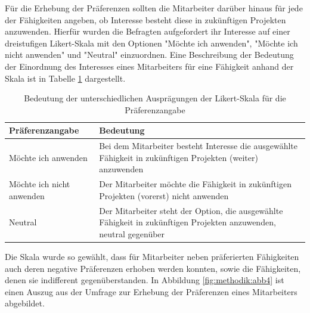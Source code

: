 Für die Erhebung der Präferenzen sollten die Mitarbeiter darüber hinaus für jede der Fähigkeiten angeben, ob Interesse besteht diese in zukünftigen Projekten anzuwenden.
Hierfür wurden die Befragten aufgefordert ihr Interesse auf einer dreistufigen Likert-Skala mit den Optionen "Möchte ich anwenden", "Möchte ich nicht anwenden" und "Neutral" einzuordnen.
Eine Beschreibung der Bedeutung der Einordnung des Interesses eines Mitarbeiters für eine Fähigkeit anhand der Skala ist in Tabelle \ref{tab:methodik:tab2} dargestellt.

\begin{table}[htbp]
    \begin{center}
    \begin{tabular}{p{1.5in}|p{3.25in}}
    {\textbf{Präferenzangabe}} & {\textbf{Bedeutung}}\\
    \hline
	Möchte ich anwenden & Bei dem Mitarbeiter besteht Interesse die ausgewählte Fähigkeit in zukünftigen Projekten (weiter) anzuwenden \\
    \hline
    Möchte ich nicht anwenden & Der Mitarbeiter möchte die Fähigkeit in zukünftigen Projekten (vorerst) nicht anwenden \\
    \hline
    Neutral & Der Mitarbeiter steht der Option, die ausgewählte Fähigkeit in zukünftigen Projekten anzuwenden, neutral gegenüber \\
    \end{tabular}
    \end{center}
    \caption[Bedeutung der unterschiedlichen Ausprägungen der Likert-Skala für die Präferenzangabe]{Bedeutung der unterschiedlichen Ausprägungen der Likert-Skala für die Präferenzangabe}
	\label{tab:methodik:tab2}
\end{table}

Die Skala wurde so gewählt, dass für Mitarbeiter neben präferierten Fähigkeiten auch deren negative Präferenzen erhoben werden konnten, sowie die Fähigkeiten, denen sie indifferent gegenüberstanden.
In Abbildung \ref{fig:methodik:abb4} ist einen Auszug aus der Umfrage zur Erhebung der Präferenzen eines Mitarbeiters abgebildet.

